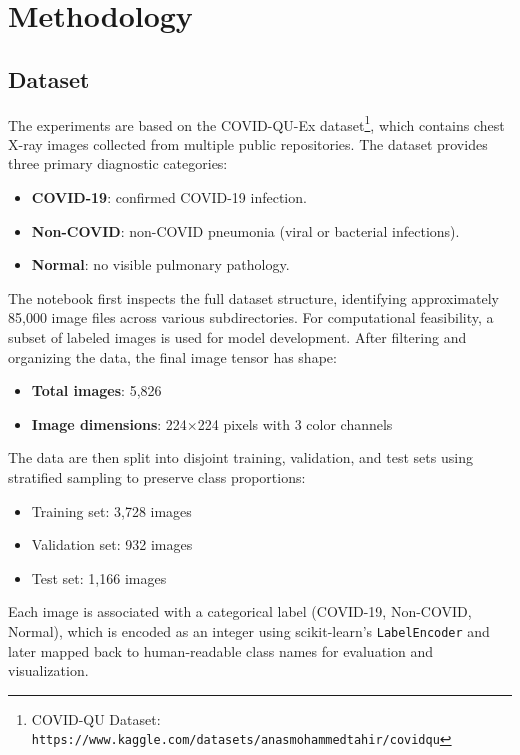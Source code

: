 \documentclass[conference]{IEEEtran}
\begin{document}
\section{Methodology}

\subsection{Dataset}

The experiments are based on the COVID-QU-Ex dataset\footnote{COVID-QU Dataset: \texttt{https://www.kaggle.com/datasets/anasmohammedtahir/covidqu}}, which contains chest X-ray images collected from multiple public repositories. The dataset provides three primary diagnostic categories:
\begin{itemize}
    \item \textbf{COVID-19}: confirmed COVID-19 infection.
    \item \textbf{Non-COVID}: non-COVID pneumonia (viral or bacterial infections).
    \item \textbf{Normal}: no visible pulmonary pathology.
\end{itemize}

The notebook first inspects the full dataset structure, identifying approximately 85{,}000 image files across various subdirectories. For computational feasibility, a subset of labeled images is used for model development. After filtering and organizing the data, the final image tensor has shape:
\begin{itemize}
    \item \textbf{Total images}: 5{,}826
    \item \textbf{Image dimensions}: 224$\times$224 pixels with 3 color channels
\end{itemize}

The data are then split into disjoint training, validation, and test sets using stratified sampling to preserve class proportions:
\begin{itemize}
    \item Training set: 3{,}728 images
    \item Validation set: 932 images
    \item Test set: 1{,}166 images
\end{itemize}

Each image is associated with a categorical label (COVID-19, Non-COVID, Normal), which is encoded as an integer using scikit-learn's \texttt{LabelEncoder} and later mapped back to human-readable class names for evaluation and visualization.
\end{document}
